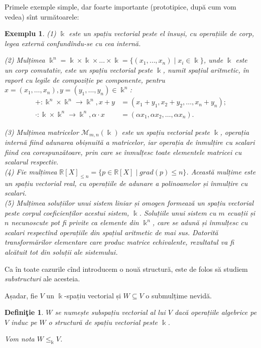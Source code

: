 \documentclass[11pt,a4paper]{article}
\newcommand\seq{\subseteq}
\theoremstyle{dotless}
\theoremstyle{dotlessdr}
\newtheorem{example}{Exemplu}[section]
\newtheorem{definition}{Defini\c{t}ie}[section]
\begin{document}
Primele exemple simple, dar foarte importante (prototipice, după cum vom vedea) 
sînt următoarele:
\begin{example}
(1) $\Bbbk$ este un spațiu vectorial peste el însuși, cu operațiile de corp, 
legea externă confundîndu-se cu cea internă.

(2) Mulțimea $\Bbbk^n = \Bbbk \times \Bbbk \times \dots \times \Bbbk 
= \{(x_1,\dots,x_n) \mid x_i \in \Bbbk\}$, unde $\Bbbk$ este un corp comutativ, 
este un spațiu vectorial peste $\Bbbk$, numit \emph{spațiul aritmetic}, în 
raport cu legile de compoziție pe componente, pentru 
$x = (x_1,\dots,x_n), y = (y_1,\dots,y_n) \in \Bbbk^n$:
\begin{align*}
+ : \Bbbk^n \times \Bbbk^n \to \Bbbk^n, x + y 
&= (x_1 + y_1, x_2 + y_2, \dots, x_n + y_n); \\
\cdot : \Bbbk \times \Bbbk^n \to \Bbbk^n, \alpha \cdot x 
&= (\alpha x_1, \alpha x_2, \dots, \alpha x_n).
\end{align*}

(3) Mulțimea matricelor $\mathcal{M}_{m,n}(\Bbbk)$ este un spațiu vectorial 
peste $\Bbbk$, operația internă fiind adunarea obișnuită a matricelor, iar 
operația de înmulțire cu scalari fiind cea corespunzătoare, prin care se 
înmulțesc toate elementele matricei cu scalarul respectiv. \\

(4) Fie mulțimea 
$\mathbb{R}[X]_{\leq n} = \{p \in \mathbb{R}[X] \mid grad(p) \leq n \}$. 
Această mulțime este un spațiu vectorial real, cu operațiile de adunare a 
polinoamelor și înmulțire cu scalari. \\

(5) Mulțimea soluțiilor unui sistem liniar și omogen formează un spațiu 
vectorial peste corpul coeficienților acestui sistem, $\Bbbk$. Soluțiile unui 
sistem cu $m$ ecuații și $n$ necunoscute pot fi privite ca elemente din 
$\Bbbk^n$, care se adună și înmulțesc cu scalari respectînd operațiile din 
spațiul aritmetic de mai sus. Datorită transformărilor elementare care produc 
matrice echivalente, rezultatul va fi alcătuit tot din soluții ale sistemului.
\end{example}

Ca în toate cazurile cînd introducem o nouă structură, este de folos să 
studiem \emph{substructuri} ale acesteia.

Așadar, fie $V$ un $\Bbbk$-spațiu vectorial și $W \seq V$ o submulțime nevidă.
\begin{definition}
$W$ se numește \emph{subspațiu vectorial} al lui $V$ dacă operațiile algebrice 
pe $V$ induc pe $W$ o structură de spațiu vectorial peste $\Bbbk$.

Vom nota $W \leq_\Bbbk V$.
\end{definition}
\end{document}
